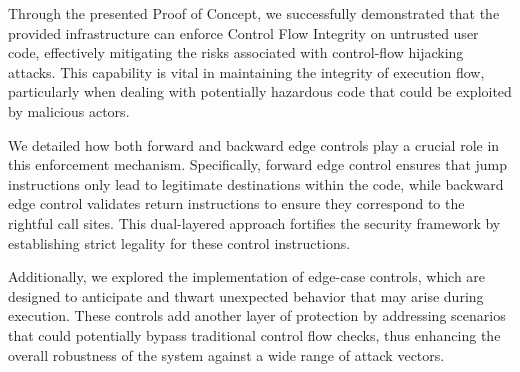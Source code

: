Through the presented Proof of Concept, we successfully demonstrated that the
provided infrastructure can enforce Control Flow Integrity on untrusted user
code, effectively mitigating the risks associated with control-flow hijacking attacks.
This capability is vital in maintaining the integrity of execution flow, particularly
when dealing with potentially hazardous code that could be exploited by malicious
actors.

We detailed how both forward and backward edge controls play a crucial role in this
enforcement mechanism. Specifically, forward edge control ensures that jump instructions
only lead to legitimate destinations within the code, while backward edge
control validates return instructions to ensure they correspond to the rightful
call sites. This dual-layered approach fortifies the security framework by establishing
strict legality for these control instructions.

Additionally, we explored the implementation of edge-case controls, which are designed
to anticipate and thwart unexpected behavior that may arise during execution.
These controls add another layer of protection by addressing scenarios that
could potentially bypass traditional control flow checks, thus enhancing the overall
robustness of the system against a wide range of attack vectors.